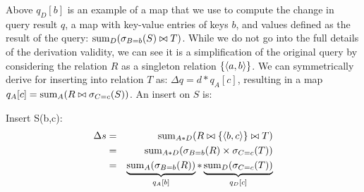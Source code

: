 Above $q_D[b]$ is an example of a map that we use to compute the change in query
result $q$, a map with key-value entries of keys $b$, and values defined as
the result of the query: $\mathrm{sum}_{D}(\sigma_{B=b}(S) \bowtie T)$. While we do
not go into the full details of the derivation validity, we can see it is a
simplification of the original query by considering the relation $R$ as a
singleton relation $\{{\langle a,b\rangle}\}$. We can symmetrically derive for inserting
into relation $T$ as: $\Delta q = d * q_A[c]$, resulting in a map
$q_A[c] = \mathrm{sum}_{A}(R \bowtie \sigma_{C=c}(S))$. An insert on $S$ is:

\smallskip
Insert S(b,c):
\begin{eqnarray*}
\Delta s &=& \mathrm{sum}_{A*D}(R \bowtie \{{\langle b,c\rangle}\} \bowtie T)
\\ &=&
\mathrm{sum}_{A*D}(\sigma_{B=b}(R) \times \sigma_{C=c}(T))
\\ &=&
\underbrace{\mathrm{sum}_{A}(\sigma_{B=b}(R))}_{q_A[b]} *
\underbrace{\mathrm{sum}_{D}(\sigma_{C=c}(T))}_{q_D[c]}
\end{eqnarray*}



